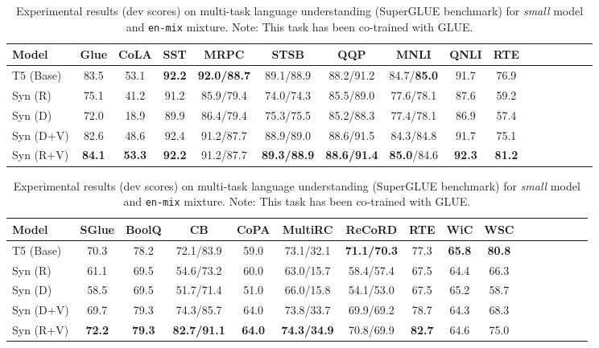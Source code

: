 \documentclass{article} \usepackage{iclr2021_conference,times}
\begin{document}
\begin{table}[H]
\small
    \centering
    \begin{tabular}{l|c|cccccccccccccc}
    \hline
        Model &	Glue &	CoLA&	SST&	MRPC	&STSB &QQP&	MNLI&	QNLI&	RTE \\ 
        \hline
T5 (Base)
& 83.5 &	53.1 &	\textbf{92.2} &	\textbf{92.0/88.7} &	89.1/88.9 &	88.2/91.2 &	84.7/\textbf{85.0} &	91.7 &	76.9 \\ 
Syn (R) & 75.1 & 	41.2 &	91.2 & 85.9/79.4 & 74.0/74.3 & 85.5/89.0 & 77.6/78.1 &87.6 &	59.2 \\
Syn (D) & 72.0 &	18.9 &	89.9 & 86.4/79.4 &	75.3/75.5 &	85.2/88.3 &	77.4/78.1 &	86.9& 	57.4 \\
Syn (D+V) & 82.6 &	48.6 &	92.4 &	91.2/87.7 &	88.9/89.0 &	88.6/91.5 &	84.3/84.8	&91.7 &	75.1 \\
Syn (R+V)	& \textbf{84.1} &	\textbf{53.3} &	\textbf{92.2} & 91.2/87.7 & \textbf{89.3/88.9} & \textbf{88.6/91.4} & \textbf{85.0}/84.6	& \textbf{92.3} & 	\textbf{81.2} \\
\hline
    \end{tabular}
    \caption{Experimental results (dev scores) on multi-task language understanding (GLUE benchmark) for \textit{small} model and \texttt{en-mix} mixture. Note: This task has been co-trained with SuperGLUE.}
    \label{tab:glue}
    \centering
    \begin{tabular}{l|c|cccccccccccccc}
    \hline
        Model &	SGlue &	BoolQ &	CB & 	CoPA & MultiRC &	ReCoRD &	RTE & 	WiC &	WSC \\ 
        \hline
T5 (Base) &	70.3 &	78.2 &	72.1/83.9 &	59.0 &	73.1/32.1 &	\textbf{71.1/70.3}	& 77.3	& \textbf{65.8} &\textbf{80.8}\\
Syn (R) &	61.1 &	69.5 &	54.6/73.2 &	60.0	& 63.0/15.7 &	58.4/57.4 &	67.5 & 	64.4 &	66.3 \\
Syn (D) & 58.5 &	69.5 & 51.7/71.4 &	51.0 &	66.0/15.8	& 54.1/53.0 &	67.5 &	65.2 &	58.7 \\
Syn (D+V) & 69.7 &	79.3 &74.3/85.7	& 64.0 & 73.8/33.7 &	69.9/69.2 &	78.7 &	64.3	 &68.3 \\
Syn (R+V) &	\textbf{72.2} &	\textbf{79.3} &	\textbf{82.7/91.1} &	\textbf{64.0} &	\textbf{74.3/34.9} &	70.8/69.9	& \textbf{82.7} &	64.6 &	75.0 \\
        \hline
    \end{tabular}
    \caption{Experimental results (dev scores) on multi-task language understanding (SuperGLUE benchmark) for \textit{small} model and \texttt{en-mix} mixture. Note: This task has been co-trained with GLUE.}
    \label{tab:superglue}
\end{table}
\end{document}
